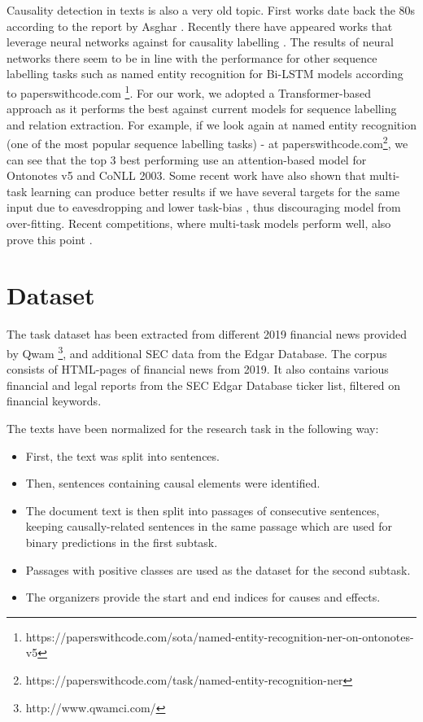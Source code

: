 \documentclass[11pt]{article}
\begin{document}
Causality detection in texts is also a very old topic.
First works date back the 80s according to the report by Asghar \cite{asghar2016automatic}.
Recently there have appeared works that leverage neural networks against for causality labelling \cite{li2019causality}. The results of neural networks there seem to be in line with the performance for other sequence labelling tasks such as named entity recognition \cite{ghaddar2018robust} for Bi-LSTM models according to paperswithcode.com \footnote{https://paperswithcode.com/sota/named-entity-recognition-ner-on-ontonotes-v5}. For our work, we adopted a Transformer-based approach as it performs the best against current models for sequence labelling and relation extraction. For example, if we look again at named entity recognition (one of the most popular sequence labelling tasks) - at paperswithcode.com\footnote{https://paperswithcode.com/task/named-entity-recognition-ner}, we can see that the top 3 best performing use an attention-based model for Ontonotes v5 and CoNLL 2003. Some recent work have also shown that multi-task learning can produce better results if we have several targets for the same input due to eavesdropping and lower task-bias \cite{ruder2017overview}, thus discouraging model from over-fitting. Recent competitions, where multi-task models perform well, also prove this point \cite{dai2020kungfupanda,renersans,bertoftrades}.
\section{{Dataset}}

The task dataset has been extracted from different 2019 financial news provided by Qwam \footnote{http://www.qwamci.com/}, and additional SEC data from the Edgar Database. The corpus consists of HTML-pages of financial news from 2019. It also contains various financial and legal reports from the SEC Edgar Database ticker list, filtered on financial keywords.
 
The texts have been normalized for the research task in the following way:
	\begin{itemize}
		\item First, the text was split into sentences.
		\item Then, sentences containing causal elements were identified. \item The document text is then split into passages of consecutive sentences, keeping causally-related sentences in the same passage which are used for binary predictions in the first subtask.
		\item Passages with positive classes are used as the dataset for the second subtask.
		\item The organizers provide the start and end indices for causes and effects.
		
	\end{itemize}
\end{document}
